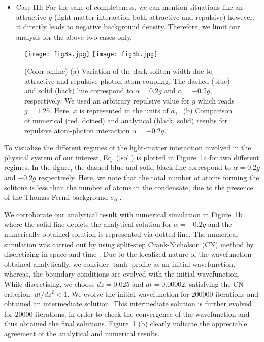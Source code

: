 \documentclass[epj]{svjour}
\begin{document}
\begin{itemize}
\item{Case III}: For the sake of completeness, we can mention situations like an attractive $g$ (light-matter interaction both attractive and repulsive) however, it directly leads to negative background density. Therefore, we limit our analysis for the above two cases only.
\end{itemize}
\begin{figure}\centering
\texttt{[image: fig3a.jpg]}
\texttt{[image: fig3b.jpg]}
\caption{(Color online) (a) Variation of the dark soliton width due to attractive and repulsive photon-atom coupling. The dashed (blue) and solid (back) line correspond to $\alpha=0.2g$ and $\alpha=-0.2g$, respectively. We used an arbitrary repulsive value for $g$ which reads $g=1.25$. Here, $x$ is represented in the units of $a_{\perp}$. (b) Comparison of numerical (red, dotted) and analytical (black, solid) results for repulsive atom-photon interaction $\alpha=-0.2g$.}
\label{density}
\end{figure}


To visualize the different regimes of the light-matter interaction involved in the physical system of our interest, Eq. (\ref{sol}) is plotted in Figure~\ref{density}a for two different regimes. In the figure, the dashed blue and solid black line correspond to $\alpha=0.2g$ and $-0.2g$ respectively. Here, we note that the total number of atoms forming the solitons is less than the number of atoms in the condensate, due to the presence of the Thomas-Fermi background $\sigma_{0}$ \cite{das1,jackson1998solitary,jackson,komineas2003nonlinear,komineas2003solitons,jackson2006bose}.

We corroborate our analytical result with numerical simulation in Figure~\ref{density}b where the solid line depicts the analytical solution for $\alpha=-0.2g$ and the numerically obtained solution is represented via dotted line. The numerical simulation was carried out by using  split-step Crank-Nicholson (CN) method by discretizing in space and time \cite{muruganandam2009fortran}. Due to the localized nature of the wavefunction obtained analytically, we consider $\tanh$-profile as an initial wavefunction, whereas, the boundary conditions are evolved with the initial wavefunction. While discretising, we choose $dz = 0.025$ and $dt = 0.00002$, satisfying the CN criterion: $dt/dz^2  < 1$. We evolve the initial wavefunction for $200000$ iterations and obtained an intermediate solution. This intermediate solution is further evolved for $20000$ iterations, in order to check the convergence of the wavefunction and thus obtained the final solutions. Figure~\ref{density} (b) clearly indicate the appreciable agreement of the analytical and numerical results.
\end{document}
